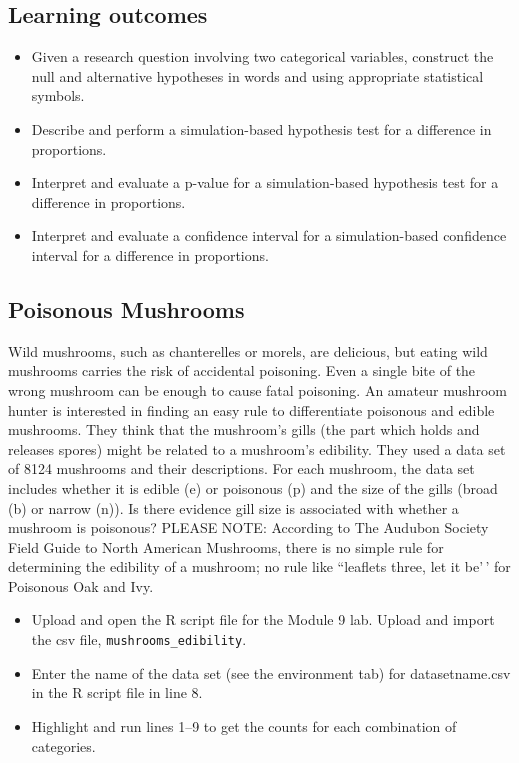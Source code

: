 \documentclass[
]{report}
\begin{document}
\subsection{Learning outcomes}\label{learning-outcomes-22}

\begin{itemize}
\item
  Given a research question involving two categorical variables, construct the null and alternative hypotheses
  in words and using appropriate statistical symbols.
\item
  Describe and perform a simulation-based hypothesis test for a difference in proportions.
\item
  Interpret and evaluate a p-value for a simulation-based hypothesis test for a difference in proportions.
\item
  Interpret and evaluate a confidence interval for a simulation-based confidence interval for a difference in proportions.
\end{itemize}

\subsection{Poisonous Mushrooms}\label{poisonous-mushrooms}

Wild mushrooms, such as chanterelles or morels, are delicious, but eating wild mushrooms carries the risk of accidental poisoning. Even a single bite of the wrong mushroom can be enough to cause fatal poisoning. An amateur mushroom hunter is interested in finding an easy rule to differentiate poisonous and edible mushrooms. They think that the mushroom's gills (the part which holds and releases spores) might be related to a mushroom's edibility. They used a data set of 8124 mushrooms and their descriptions. For each mushroom, the data set includes whether it is edible (e) or poisonous (p) and the size of the gills (broad (b) or narrow (n)). Is there evidence gill size is associated with whether a mushroom is poisonous? PLEASE NOTE: According to The Audubon Society Field Guide to North American Mushrooms, there is no simple rule for determining the edibility of a mushroom; no rule like ``leaflets three, let it be'\,' for Poisonous Oak and Ivy.

\begin{itemize}
\item
  Upload and open the R script file for the Module 9 lab. Upload and import the csv file, \texttt{mushrooms\_edibility}.
\item
  Enter the name of the data set (see the environment tab) for datasetname.csv in the R script file in line 8.
\item
  Highlight and run lines 1--9 to get the counts for each combination of categories.
\end{itemize}
\end{document}
